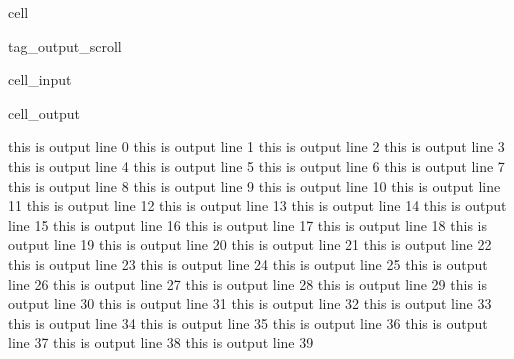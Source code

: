 \documentclass[letterpaper,10pt,english]{jupyterBook}
\begin{document}
\begin{sphinxuseclass}{cell}
\begin{sphinxuseclass}{tag_output_scroll}\begin{sphinxVerbatimInput}

\begin{sphinxuseclass}{cell_input}
\begin{sphinxVerbatim}[commandchars=\\\{\}]
   
\end{sphinxVerbatim}

\end{sphinxuseclass}\end{sphinxVerbatimInput}
\begin{sphinxVerbatimOutput}

\begin{sphinxuseclass}{cell_output}
\begin{sphinxVerbatim}[commandchars=\\\{\}]
this is output line 0
this is output line 1
this is output line 2
this is output line 3
this is output line 4
this is output line 5
this is output line 6
this is output line 7
this is output line 8
this is output line 9
this is output line 10
this is output line 11
this is output line 12
this is output line 13
this is output line 14
this is output line 15
this is output line 16
this is output line 17
this is output line 18
this is output line 19
this is output line 20
this is output line 21
this is output line 22
this is output line 23
this is output line 24
this is output line 25
this is output line 26
this is output line 27
this is output line 28
this is output line 29
this is output line 30
this is output line 31
this is output line 32
this is output line 33
this is output line 34
this is output line 35
this is output line 36
this is output line 37
this is output line 38
this is output line 39
\end{sphinxVerbatim}

\end{sphinxuseclass}\end{sphinxVerbatimOutput}

\end{sphinxuseclass}
\end{sphinxuseclass}
\end{document}
